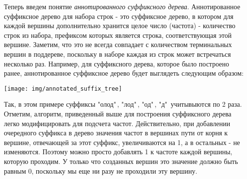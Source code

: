 Теперь введем понятие \emph{аннотированного суффиксного дерева}. Аннотированное суффиксное дерево для набора строк - это суффиксное дерево, в котором для каждой вершины дополнительно хранится целое число (частота) - количество строк из набора, префиксом которых является строка, соответствующая этой вершине. Заметим, что это не всегда совпадает с количеством терминальных вершин в поддереве, поскольку в наборе каждая из строк может встречаться несколько раз. \newline
Например, для суффиксного дерева, которое было построено ранее, аннотированное суффиксное дерево будет выглядеть следующим образом:
\begin{center} 
	\texttt{[image: img/annotated\_suffix\_tree]}
\end{center}
Так, в этом примере суффиксы "олод"\,, "лод"\,, "од"\,, "д"\ учитывыются по 2 раза. \newline
Отметим, алгоритм, приведенный выше для построения суффиксного дерева легко модифицировать для подсчета частот. Действительно, при добавлении очередного суффикса в дерево значения частот в вершинах пути от корня к вершине, отвечающей за этот суффикс, увеличиваются на 1, а в остальных - не изменяются. Поэтому можно просто добавлять 1 к частоте каждой вершины, которую проходим. У только что созданных вершин это значение должно быть равным 0, поскольку мы еще ни разу не проходили эту вершину.\newline
